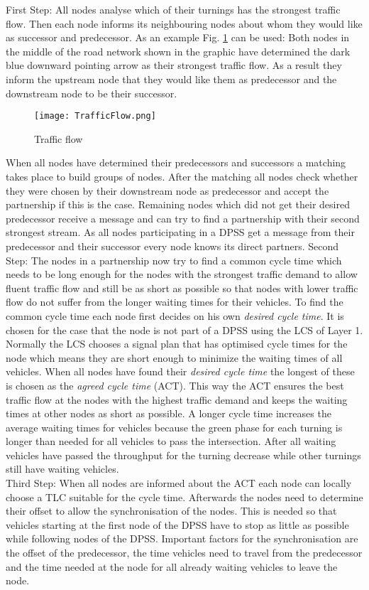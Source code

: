 First Step: All nodes analyse which of their turnings has the strongest traffic flow. Then each node informs its neighbouring nodes about whom they would like as successor and predecessor. As an example Fig. \ref{fig:flow} can be used: Both nodes in the middle of the road network shown in the graphic have determined the dark blue downward pointing arrow as their strongest traffic flow. As a result they inform the upstream node that they would like them as predecessor and the downstream node to be their successor.

\begin{figure} [!htb]
	\centering
	\texttt{[image: TrafficFlow.png]}
	\caption{Traffic flow \cite{organicHPSS}}
	\label{fig:flow}
\end{figure}

When all nodes have determined their predecessors and successors a matching takes place to build groups of nodes. After the matching all nodes check whether they were chosen by their downstream node as predecessor and accept the partnership if this is the case. Remaining nodes which did not get their desired predecessor receive a message and can try to find a partnership with their second strongest stream. As all nodes participating in a DPSS get a message from their predecessor and their successor every node knows its direct partners.\cite{organic1}
Second Step: The nodes in a partnership now try to find a common cycle time which needs to be long enough for the nodes with the strongest traffic demand to allow fluent traffic flow and still be as short as possible so that nodes with lower traffic flow do not suffer from the longer waiting times for their vehicles.
To find the common cycle time each node first decides on his own \textit{desired cycle time}. It is chosen for the case that the node is not part of a DPSS using the LCS of Layer 1. Normally the LCS chooses a signal plan that has optimised cycle times for the node which means they are short enough to minimize the waiting times of all vehicles.
When all nodes have found their \textit{desired cycle time} the longest of these is chosen as the \textit{agreed cycle time} (ACT). This way the ACT ensures the best traffic flow at the nodes with the highest traffic demand and keeps the waiting times at other nodes as short as possible. A longer cycle time increases the average waiting times for vehicles because the green phase for each turning is longer than needed for all vehicles to pass the intersection. After all waiting vehicles have passed the throughput for the turning decrease while other turnings still have waiting vehicles. \cite{organic1}\ \\
Third Step: When all nodes are informed about the ACT each node can locally choose a TLC suitable for the cycle time. Afterwards the nodes need to determine their offset to allow the synchronisation of the nodes. This is needed so that vehicles starting at the first node of the DPSS have to stop as little as possible while following nodes of the DPSS. Important factors for the synchronisation are the offset of the predecessor, the time vehicles need to travel from the predecessor and the time needed at the node for all already waiting vehicles to leave the node.\cite{organic1}


